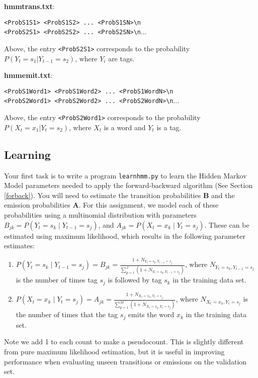 \documentclass[11pt,addpoints,answers]{exam}
\begin{document}
\begin{enumerate}
\textbf{hmmtrans.txt}:

\texttt{<ProbS1S1> <ProbS1S2> ... <ProbS1SN>\textbackslash n}\\
\texttt{<ProbS2S1> <ProbS2S2> ... <ProbS2SN>\textbackslash n}...

Above, the entry \texttt{<ProbS2S1>} corresponds to the probability $P(Y_t = s_1 | Y_{t-1} = s_2)$, where $Y_i$ are tags.

\textbf{hmmemit.txt}:

\texttt{<ProbS1Word1> <ProbS1Word2> ... <ProbS1WordN>\textbackslash n}\\
\texttt{<ProbS2Word1> <ProbS2Word2> ... <ProbS2WordN>\textbackslash n}...

Above, the entry \texttt{<ProbS2Word1>} corresponds to the probability $P(X_t = x_1 | Y_t = s_2)$, where $X_t$ is a word and $Y_t$ is a tag.


\end{enumerate}

\subsection{Learning}\label{learn}
Your first task is to write a program \texttt{learnhmm.py} to learn the Hidden Markov Model parameters needed to apply the forward-backward algorithm (See Section \ref{forback}). You will need to estimate the transition probabilities $\mathbf B$ and the emission probabilities $\mathbf A$. For this assignment, we model each of these probabilities using a multinomial distribution with parameters $ B_{jk} = P(Y_{t}=s_k\mid Y_{t-1}=s_j)$, and $ A_{jk} = P(X_t=x_k\mid Y_{t}=s_j)$. These can be estimated using maximum likelihood, which results in the following parameter estimates:

\begin{enumerate}
    \item $P(Y_{t} = s_k\mid Y_{t-1}=s_j) = B_{jk}= \frac{1+N_{Y_t=s_k,Y_{t-1}=s_j}}{\sum_{p=1}^J (1+N_{Y_t=s_p,Y_{t-1}=s_j})}$, where $N_{Y_t=s_k,Y_{t-1}=s_j}$ is the number of times tag $s_j$ is followed by tag $s_k$ in the training data set.
    \item $P(X_{t} = x_k\mid Y_{t}=s_j) = A_{jk}= \frac{1+N_{X_t=x_k,Y_t=s_j}}{\sum_{p=1}^M (1+N_{X_t=x_p,Y_t=s_j})}$, where $N_{X_t=x_k,Y_t=s_j}$ is the number of times that the tag $s_j$ emits the word $x_k$ in the training data set.
\end{enumerate}

Note we add 1 to each count to make a pseudocount. This is slightly different from pure maximum likelihood estimation, but it is useful in improving performance when evaluating unseen transitions or emissions on the validation set.
\end{document}
